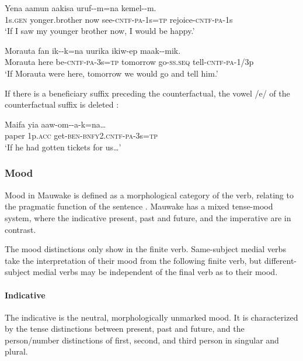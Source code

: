 \ea%
\label{ex:3:x433}
\gll Yena aamun aakisa uruf--m=na kemel--m. \\
1s.\textsc{gen} yonger.brother now see-\textsc{cntf}-\textsc{pa}-1s=\textsc{tp} rejoice-\textsc{cntf}-\textsc{pa}-1s\\
\glt`If I saw my younger brother now, I would be happy.'
\z

\ea%
\label{ex:3:x434}
\gll Morauta fan ik--k=na uurika ikiw-ep maak--mik.\\
Morauta here be-\textsc{cntf}-\textsc{pa}-3s=\textsc{tp} tomorrow go-\textsc{ss}.\textsc{seq} tell-\textsc{cntf}-\textsc{pa}-1/3p\\
\glt`If Morauta were here, tomorrow we would go and tell him.'
\z

If there is a beneficiary suffix  preceding the counterfactual, the vowel /e/ of the counterfactual suffix is deleted :

\ea%
\label{ex:3:x235}
\gll Maifa yia aaw-om--a-k=na{\dots} \\
paper 1p.\textsc{acc} get-\textsc{ben}-\textsc{bnfy}2.\textsc{cntf}-\textsc{pa}-3s=\textsc{tp} \\
\glt`If he had gotten tickets for us{\dots}'
\z

\subsubsection{Mood}\label{sec:3.8.3.3}
{}
Mood in Mauwake is defined as a morphological category of the verb, relating to the pragmatic function of the sentence \citep[cf.][21]{Palmer1986}. Mauwake has a mixed tense-mood system, where the indicative present, past and future, and the imperative are in contrast. 

The mood distinctions only show in the finite verb. Same-subject medial verbs take the interpretation of their mood from the following finite verb, but different-subject medial verbs may be independent of the final verb as to their mood.

\paragraph{Indicative}
{}
The indicative is the neutral, morphologically unmarked mood. It is characterized by the tense distinctions between present, past and future, and the person/number distinctions of first, second, and third person in singular and plural. 

